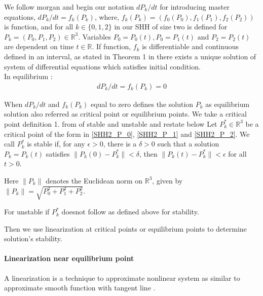 \documentclass[paper=a4, fontsize=11pt, twoside, BCOR=12mm, parskip=full, listof=totoc]{scrreprt}
\begin{document}
We follow morgan \cite{morgan2015linearization} and begin our notation $dP_k/dt$ for introducing master equations, $dP_k/dt = f_k(P_k)$, where, $f_k(P_k) = (f_0(P_0),f_1(P_1),f_2(P_2))$ is function, and for all $k \in \{ 0,1,2 \}$ in our SHH of size two is defined for $ P_k = (P_0, P_1, P_2) \in \mathbb{R}^3$. Variables $P_0 = P_0(t),P_0 = P_1(t) \text{ and }P_2 = P_2(t)$ are dependent on time $t \in \mathbb{R}$. If function, $f_k$ is differentiable and continuous defined in an interval, as stated in Theorem 1 in \cite{morgan2015linearization} there exists a unique solution of system of differential equations which satisfies initial condition.\\ 
  
In equilibrium :   
\begin{equation}
\label{function_pk}
	\begin{aligned}
	   	dP_k/dt = f_k(P_k) = 0   
	\end{aligned}	 
\end{equation}

When $dP_k/dt$ and $f_k(P_k)$ equal to zero defines the solution $P_k$ as equilibrium solution also referred as critical point or equilibrium points. We take a critical point definition 1. from \cite{morgan2015linearization} of stable and unstable and restate below 
Let \( P_k^* \in \mathbb{R}^3 \) be a critical point of the form in \ref{SHH2_P_0}, \ref{SHH2_P_1}  and \ref{SHH2_P_2}. We call \( P_k^* \) is stable if, for any \( \epsilon > 0 \), there is a \( \delta > 0 \) such that a solution \( P_k = P_k(t) \) satisfies \( \| P_k(0) - P_k^* \| < \delta \), then
\( \| P_k(t) - P_k^* \| < \epsilon \) for all \( t > 0 \).

Here \( \|P_k\| \) denotes the Euclidean norm on \( \mathbb{R}^3 \), given by \( \|P_k\| = \sqrt{P_0^2 + P_1^2 + P_2^2 } \).

For unstable if \( P_k^* \) doesnot follow as defined above for stability.

Then we use linearization at critical points or equilibrium points to determine solution's stability.

\paragraph*{Linearization near equilibrium point}
\label{Linearization around equilibrium point}
 A linearization is a technique to approximate nonlinear system as similar to approximate smooth function with tangent line \cite{morgan2015linearization}. 	
\end{document}
